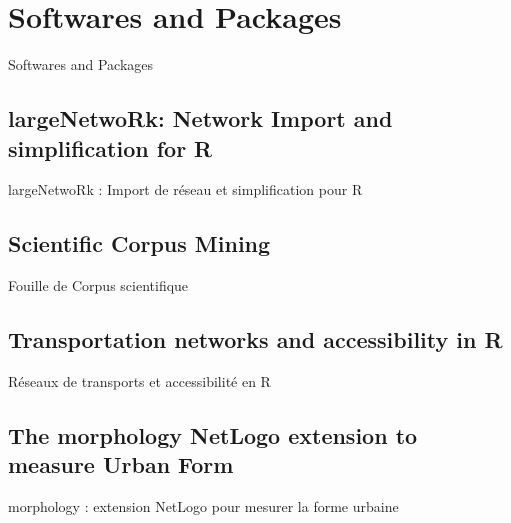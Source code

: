 
\newpage

\section{Softwares and Packages}{Softwares and Packages} %

\label{app:packages} %









\subsection{largeNetwoRk: Network Import and simplification for R}{largeNetwoRk : Import de réseau et simplification pour R}



\subsection{Scientific Corpus Mining}{Fouille de Corpus scientifique}






\subsection{Transportation networks and accessibility in R}{Réseaux de transports et accessibilité en R}







\subsection{The morphology NetLogo extension to measure Urban Form}{morphology : extension NetLogo pour mesurer la forme urbaine}

\label{app:subsec:morphologyextension}



